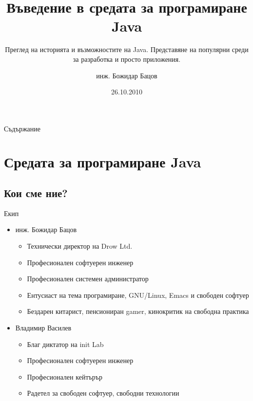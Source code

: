 \documentclass{beamer}
\title{Въведение в средата за програмиране Java}
\subtitle{Преглед на историята и възможностите на Java. Представяне на
  популярни среди за разработка и просто приложения.}
\author{инж. Божидар Бацов}
\institute{Drow Ltd.}
\date{26.10.2010}
\begin{document}
\begin{frame}
  \titlepage
\end{frame}

\begin{frame}{Съдържание}
  \tableofcontents
\end{frame}




\section{Средата за програмиране Java}

\subsection[Кои сме ние?]{Кои сме ние?}

\begin{frame}{Екип}
  \transdissolve
  \begin{itemize}
  \item
    инж. Божидар Бацов
    \begin{itemize}
    \item Технически директор на Drow Ltd.
    \item Професионален софтуерен инженер
    \item Професионален системен администратор
    \item Ентусиаст на тема програмиране, GNU/Linux, Emacs и свободен
      софтуер
    \item Бездарен китарист, пенсиониран gamer, кинокритик на свободна
      практика
    \end{itemize}
  \item
    Владимир Василев
    \begin{itemize}
      \item Благ диктатор на init Lab
      \item Професионален софтуерен инженер
      \item Професионален кейтърър
      \item Радетел за свободен софтуер, свободни технологии
    \end{itemize}

  \end{itemize}
\end{frame}
\end{document}
